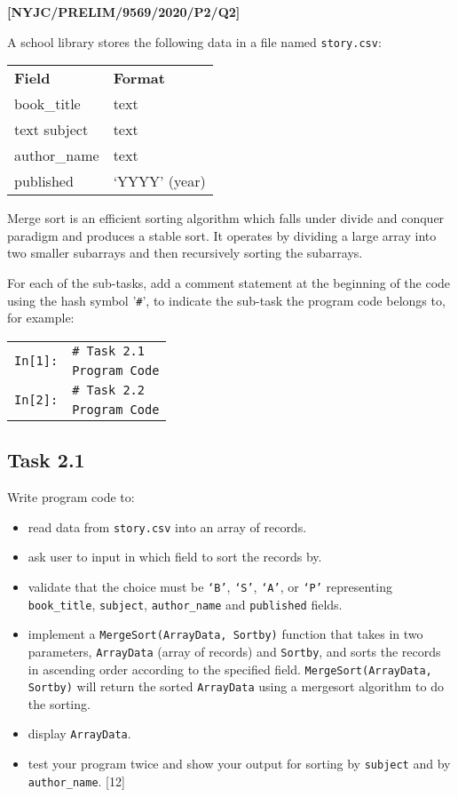 \item \textbf{{[}NYJC/PRELIM/9569/2020/P2/Q2{]} }

A school library stores the following data in a file named \texttt{story.csv}: 

\begin{tabular}{ll}
\textbf{Field} & \textbf{Format}\tabularnewline
book\_title & text\tabularnewline
text subject & text\tabularnewline
author\_name & text\tabularnewline
published & \textquoteleft YYYY\textquoteright{} (year) \tabularnewline
\end{tabular}

Merge sort is an efficient sorting algorithm which falls under divide
and conquer paradigm and produces a stable sort. It operates by dividing
a large array into two smaller subarrays and then recursively sorting
the subarrays. 

For each of the sub-tasks, add a comment statement at the beginning
of the code using the hash symbol '\texttt{\#}', to indicate the sub-task
the program code belongs to, for example: 
\noindent \begin{center}
\begin{tabular}{c|l|}
\cline{2-2} 
\multirow{2}{*}{\texttt{In{[}1{]}:}} & \texttt{\# Task 2.1}\tabularnewline
 & \texttt{Program Code}\tabularnewline
\cline{2-2} 
\multirow{2}{*}{\texttt{In{[}2{]}:}} & \texttt{\# Task 2.2}\tabularnewline
 & \texttt{Program Code}\tabularnewline
\cline{2-2} 
\end{tabular}
\par\end{center}

\subsection*{Task 2.1 }

Write program code to: 
\begin{itemize}
\item read data from \texttt{story.csv} into an array of records. 
\item ask user to input in which field to sort the records by.
\item validate that the choice must be \texttt{\textquoteleft B\textquoteright },
\texttt{\textquoteleft S\textquoteright }, \texttt{\textquoteleft A\textquoteright },
or \texttt{\textquoteleft P\textquoteright{}} representing \texttt{book\_title},
\texttt{subject}, \texttt{author\_name} and \texttt{published} fields. 
\item implement a \texttt{MergeSort(ArrayData, Sortby)} function that takes
in two parameters, \texttt{ArrayData} (array of records) and \texttt{Sortby},
and sorts the records in ascending order according to the specified
field. \texttt{MergeSort(ArrayData, Sortby)} will return the sorted
\texttt{ArrayData} using a mergesort algorithm to do the sorting. 
\item display \texttt{ArrayData}. 
\item test your program twice and show your output for sorting by \texttt{subject}
and by \texttt{author\_name}. \hfill{} {[}12{]}
\end{itemize}

